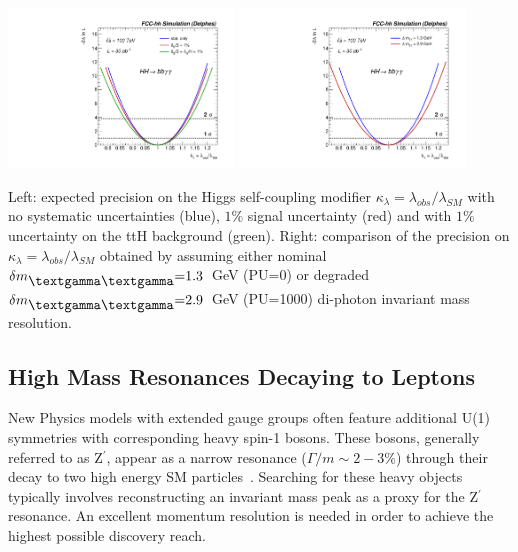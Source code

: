 \documentclass[11pt,twoside,a4paper]{cernrep}
\begin{document}
\begin{Figure}
  \centering
  \includegraphics[width=0.45\textwidth]{hh_syst.pdf}
  \includegraphics[width=0.45\textwidth]{hh_gamma.pdf}
  \caption{Left: expected precision on the Higgs self-coupling modifier $\kappa_{\lambda}{=}\lambda_{obs}/\lambda_{SM}$ with no systematic uncertainties (blue), $1\%$ signal uncertainty (red) and with $1\%$ uncertainty on the ttH background (green). Right: comparison of the precision on $\kappa_{\lambda}{=}\lambda_{obs}/\lambda_{SM}$ obtained by assuming either nominal $\delta m_{\mbox{\textgamma\textgamma}} {=}1.3$~GeV (PU=0) or degraded $\delta m_{\mbox{\textgamma\textgamma}}{=}2.9$~GeV (PU=1000) di-photon invariant mass resolution.}
  \label{fig:higgs}
\end{Figure}

\subsection{High Mass Resonances Decaying to Leptons}
New Physics models with extended gauge groups often feature additional U(1) symmetries with corresponding heavy spin-1 bosons. These bosons, generally referred to as Z$^{\prime}$, appear as a narrow resonance \mbox{($\Gamma/m \sim 2-3\%$)} through their decay to two high energy SM particles~\cite{London:1986jz,Joglekar:2016yap,Langacker:2008yv,Salvioni:2009mt}. Searching for these heavy objects typically involves reconstructing an invariant mass peak as a proxy for the Z$^{\prime}$ resonance. An excellent momentum resolution is needed in order to achieve the highest possible discovery reach.
\end{document}
